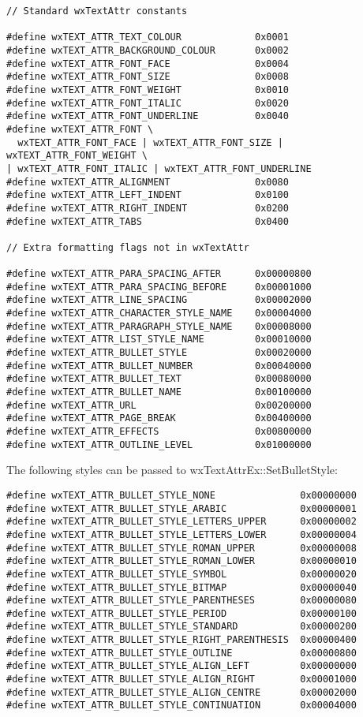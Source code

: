 {\small
\begin{verbatim}
// Standard wxTextAttr constants

#define wxTEXT_ATTR_TEXT_COLOUR             0x0001
#define wxTEXT_ATTR_BACKGROUND_COLOUR       0x0002
#define wxTEXT_ATTR_FONT_FACE               0x0004
#define wxTEXT_ATTR_FONT_SIZE               0x0008
#define wxTEXT_ATTR_FONT_WEIGHT             0x0010
#define wxTEXT_ATTR_FONT_ITALIC             0x0020
#define wxTEXT_ATTR_FONT_UNDERLINE          0x0040
#define wxTEXT_ATTR_FONT \
  wxTEXT_ATTR_FONT_FACE | wxTEXT_ATTR_FONT_SIZE | wxTEXT_ATTR_FONT_WEIGHT \
| wxTEXT_ATTR_FONT_ITALIC | wxTEXT_ATTR_FONT_UNDERLINE
#define wxTEXT_ATTR_ALIGNMENT               0x0080
#define wxTEXT_ATTR_LEFT_INDENT             0x0100
#define wxTEXT_ATTR_RIGHT_INDENT            0x0200
#define wxTEXT_ATTR_TABS                    0x0400

// Extra formatting flags not in wxTextAttr

#define wxTEXT_ATTR_PARA_SPACING_AFTER      0x00000800
#define wxTEXT_ATTR_PARA_SPACING_BEFORE     0x00001000
#define wxTEXT_ATTR_LINE_SPACING            0x00002000
#define wxTEXT_ATTR_CHARACTER_STYLE_NAME    0x00004000
#define wxTEXT_ATTR_PARAGRAPH_STYLE_NAME    0x00008000
#define wxTEXT_ATTR_LIST_STYLE_NAME         0x00010000
#define wxTEXT_ATTR_BULLET_STYLE            0x00020000
#define wxTEXT_ATTR_BULLET_NUMBER           0x00040000
#define wxTEXT_ATTR_BULLET_TEXT             0x00080000
#define wxTEXT_ATTR_BULLET_NAME             0x00100000
#define wxTEXT_ATTR_URL                     0x00200000
#define wxTEXT_ATTR_PAGE_BREAK              0x00400000
#define wxTEXT_ATTR_EFFECTS                 0x00800000
#define wxTEXT_ATTR_OUTLINE_LEVEL           0x01000000
\end{verbatim}
}

The following styles can be passed to wxTextAttrEx::SetBulletStyle:

{\small
\begin{verbatim}
#define wxTEXT_ATTR_BULLET_STYLE_NONE               0x00000000
#define wxTEXT_ATTR_BULLET_STYLE_ARABIC             0x00000001
#define wxTEXT_ATTR_BULLET_STYLE_LETTERS_UPPER      0x00000002
#define wxTEXT_ATTR_BULLET_STYLE_LETTERS_LOWER      0x00000004
#define wxTEXT_ATTR_BULLET_STYLE_ROMAN_UPPER        0x00000008
#define wxTEXT_ATTR_BULLET_STYLE_ROMAN_LOWER        0x00000010
#define wxTEXT_ATTR_BULLET_STYLE_SYMBOL             0x00000020
#define wxTEXT_ATTR_BULLET_STYLE_BITMAP             0x00000040
#define wxTEXT_ATTR_BULLET_STYLE_PARENTHESES        0x00000080
#define wxTEXT_ATTR_BULLET_STYLE_PERIOD             0x00000100
#define wxTEXT_ATTR_BULLET_STYLE_STANDARD           0x00000200
#define wxTEXT_ATTR_BULLET_STYLE_RIGHT_PARENTHESIS  0x00000400
#define wxTEXT_ATTR_BULLET_STYLE_OUTLINE            0x00000800
#define wxTEXT_ATTR_BULLET_STYLE_ALIGN_LEFT         0x00000000
#define wxTEXT_ATTR_BULLET_STYLE_ALIGN_RIGHT        0x00001000
#define wxTEXT_ATTR_BULLET_STYLE_ALIGN_CENTRE       0x00002000
#define wxTEXT_ATTR_BULLET_STYLE_CONTINUATION       0x00004000
\end{verbatim}
}

